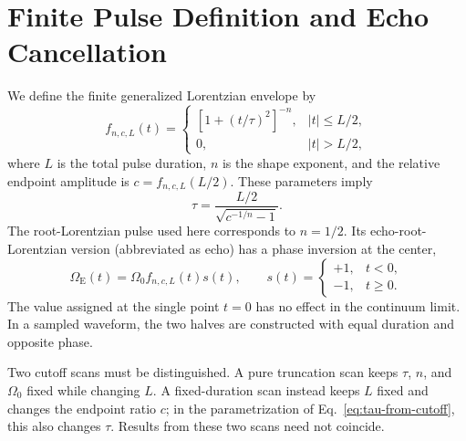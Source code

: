 \section{Finite Pulse Definition and Echo Cancellation}
\label{sec:pulse-definition}

We define the finite generalized Lorentzian envelope by
\begin{equation}
    f_{n,c,L}(t)
    =
    \begin{cases}
    \left[1+(t/\tau)^2\right]^{-n}, & |t|\le L/2,\\
    0, & |t|>L/2,
    \end{cases}
    \label{eq:finite-generalized-lorentzian}
\end{equation}
where $L$ is the total pulse duration, $n$ is the shape exponent, and the
relative endpoint amplitude is $c=f_{n,c,L}(L/2)$.  These parameters imply
\begin{equation}
    \tau
    =
    \frac{L/2}{\sqrt{c^{-1/n}-1}}.
    \label{eq:tau-from-cutoff}
\end{equation}
The root-Lorentzian pulse used here corresponds to $n=1/2$. Its
echo-root-Lorentzian version (abbreviated as echo) has a phase inversion
at the center,
\begin{equation}
    \Omega_{\mathrm{E}}(t)
    = \Omega_0 f_{n,c,L}(t)s(t),
    \qquad
    s(t)=
    \begin{cases}
    +1,&t<0,\\
    -1,&t\ge0.
    \end{cases}
    \label{eq:echo-pulse-definition}
\end{equation}
The value assigned at the single point $t=0$ has no effect in the continuum
limit.  In a sampled waveform, the two halves are constructed with equal
duration and opposite phase.

Two cutoff scans must be distinguished.  A pure truncation scan keeps
$\tau$, $n$, and $\Omega_0$ fixed while changing $L$.  A fixed-duration
scan instead keeps $L$ fixed and changes the endpoint ratio $c$; in
the parametrization of Eq.~\eqref{eq:tau-from-cutoff}, this also changes
$\tau$.  Results from these two scans need not coincide.

